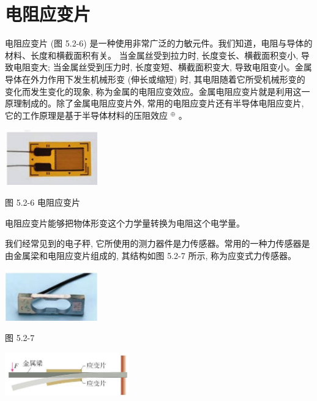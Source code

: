\documentclass[10pt]{article}
\begin{document}
\section*{电阻应变片}

电阻应变片 (图 5.2-6) 是一种使用非常广泛的力敏元件。我们知道，电阻与导体的材料、长度和横截面积有关。 当金属丝受到拉力时, 长度变长、横截面积变小, 导致电阻变大; 当金属丝受到压力时, 长度变短、横截面积变大, 导致电阻变小。金属导体在外力作用下发生机械形变 (伸长或缩短) 时, 其电阻随着它所受机械形变的变化而发生变化的现象, 称为金属的电阻应变效应。金属电阻应变片就是利用这一原理制成的。除了金属电阻应变片外, 常用的电阻应变片还有半导体电阻应变片, 它的工作原理是基于半导体材料的压阻效应 \({}^{ \oplus }\) 。

\begin{center}
\includegraphics[max width=0.3\textwidth]{images/01910e72-c5b7-7ed5-a6d4-fb3a5faefc32_104_283429.jpg}
\end{center}

图 5.2-6 电阻应变片

电阻应变片能够把物体形变这个力学量转换为电阻这个电学量。

我们经常见到的电子秤, 它所使用的测力器件是力传感器。常用的一种力传感器是由金属梁和电阻应变片组成的, 其结构如图 5.2-7 所示, 称为应变式力传感器。

\begin{center}
\includegraphics[max width=0.3\textwidth]{images/01910e72-c5b7-7ed5-a6d4-fb3a5faefc32_105_251035.jpg}
\end{center}

图 5.2-7

\begin{center}
\includegraphics[max width=0.4\textwidth]{images/01910e72-c5b7-7ed5-a6d4-fb3a5faefc32_105_564769.jpg}
\end{center}
\end{document}
